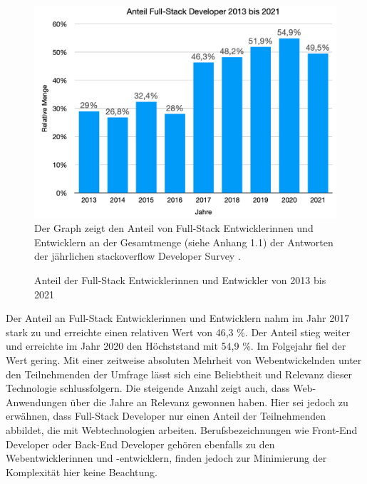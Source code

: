 \documentclass[a4paper]{scrartcl}
\begin{document}
\begin{figure}[H]
	\centering
		\caption{Anteil der Full-Stack Entwicklerinnen und Entwickler von 2013 bis 2021}
	\includegraphics[scale=0.28]{_assets/stackoverflow_fullstack_developers.png} \\
	Der Graph zeigt den Anteil von Full-Stack Entwicklerinnen und Entwicklern an der Gesamtmenge (siehe Anhang 1.1) der Antworten der jährlichen stackoverflow Developer Survey \autocite{stackoverflow_2015,stackoverflow_2016,stackoverflow_2017,stackoverflow_2018,stackoverflow_2019,stackoverflow_2020,stackoverflow_2021}.  
\end{figure}

Der Anteil an Full-Stack Entwicklerinnen und Entwicklern nahm im Jahr 2017 stark zu und erreichte einen relativen Wert von 46,3 \%. Der Anteil stieg weiter und erreichte im Jahr 2020 den Höchststand mit 54,9 \%. Im Folgejahr fiel der Wert gering. Mit einer zeitweise absoluten Mehrheit von Webentwickelnden unter den Teilnehmenden der Umfrage lässt sich eine Beliebtheit und Relevanz dieser Technologie schlussfolgern. Die steigende Anzahl zeigt auch, dass Web-Anwendungen über die Jahre an Relevanz gewonnen haben. Hier sei jedoch zu erwähnen, dass Full-Stack Developer nur einen Anteil der Teilnehmenden abbildet, die mit Webtechnologien arbeiten. Berufsbezeichnungen wie Front-End Developer oder Back-End Developer gehören ebenfalls zu den Webentwicklerinnen und -entwicklern, finden jedoch zur Minimierung der Komplexität hier keine Beachtung. \\ 
\end{document}

